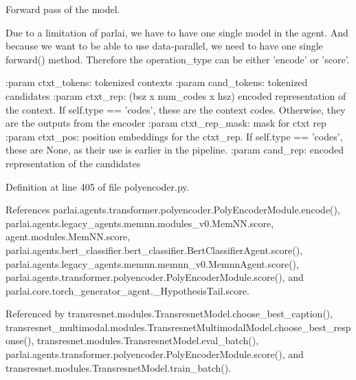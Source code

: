 \begin{DoxyVerb}Forward pass of the model.

Due to a limitation of parlai, we have to have one single model
in the agent. And because we want to be able to use data-parallel,
we need to have one single forward() method.
Therefore the operation_type can be either 'encode' or 'score'.

:param ctxt_tokens:
    tokenized contexts
:param cand_tokens:
    tokenized candidates
:param ctxt_rep:
    (bsz x num_codes x hsz)
    encoded representation of the context. If self.type == 'codes', these
    are the context codes. Otherwise, they are the outputs from the
    encoder
:param ctxt_rep_mask:
    mask for ctxt rep
:param ctxt_pos:
    position embeddings for the ctxt_rep. If self.type == 'codes', these
    are None, as their use is earlier in the pipeline.
:param cand_rep:
    encoded representation of the candidates
\end{DoxyVerb}
 

Definition at line 405 of file polyencoder.\+py.



References parlai.\+agents.\+transformer.\+polyencoder.\+Poly\+Encoder\+Module.\+encode(), parlai.\+agents.\+legacy\+\_\+agents.\+memnn.\+modules\+\_\+v0.\+Mem\+N\+N.\+score, agent.\+modules.\+Mem\+N\+N.\+score, parlai.\+agents.\+bert\+\_\+classifier.\+bert\+\_\+classifier.\+Bert\+Classifier\+Agent.\+score(), parlai.\+agents.\+legacy\+\_\+agents.\+memnn.\+memnn\+\_\+v0.\+Memnn\+Agent.\+score(), parlai.\+agents.\+transformer.\+polyencoder.\+Poly\+Encoder\+Module.\+score(), and parlai.\+core.\+torch\+\_\+generator\+\_\+agent.\+\_\+\+Hypothesis\+Tail.\+score.



Referenced by transresnet.\+modules.\+Transresnet\+Model.\+choose\+\_\+best\+\_\+caption(), transresnet\+\_\+multimodal.\+modules.\+Transresnet\+Multimodal\+Model.\+choose\+\_\+best\+\_\+response(), transresnet.\+modules.\+Transresnet\+Model.\+eval\+\_\+batch(), parlai.\+agents.\+transformer.\+polyencoder.\+Poly\+Encoder\+Module.\+score(), and transresnet.\+modules.\+Transresnet\+Model.\+train\+\_\+batch().

